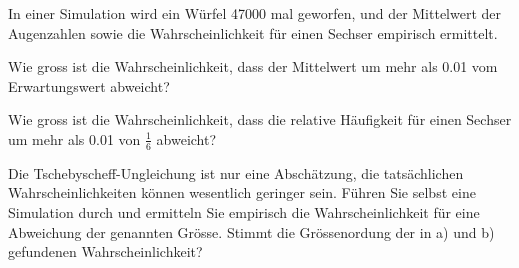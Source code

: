 In einer Simulation wird ein Würfel 47000 mal geworfen, und der Mittelwert
der Augenzahlen sowie die Wahrscheinlichkeit für einen Sechser empirisch
ermittelt.

\begin{teilaufgaben}
\item Wie gross ist die Wahrscheinlichkeit, dass der Mittelwert um mehr
als 0.01 vom Erwartungswert abweicht?
\item Wie gross ist die Wahrscheinlichkeit, dass die relative Häufigkeit
für einen Sechser um mehr als 0.01 von $\frac16$ abweicht?
\item Die Tschebyscheff-Ungleichung ist nur eine Abschätzung, die
tatsächlichen Wahrscheinlichkeiten können wesentlich geringer sein.
Führen Sie selbst eine Simulation durch und ermitteln Sie empirisch die
Wahrscheinlichkeit für eine Abweichung der genannten Grösse. 
Stimmt die Grössenordung der in a) und b) gefundenen Wahrscheinlichkeit?
\end{teilaufgaben}


